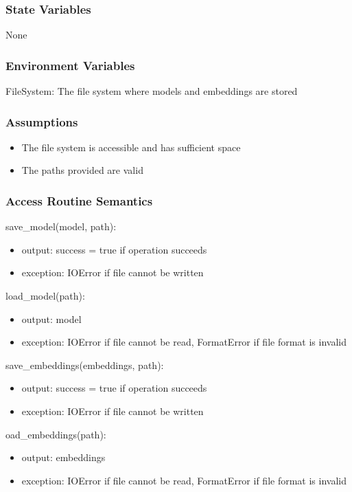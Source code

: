 \documentclass[12pt, titlepage]{article}
\begin{document}
\subsubsection{State Variables}
None

\subsubsection{Environment Variables}

FileSystem: The file system where models and embeddings are stored

\subsubsection{Assumptions}

\begin{itemize}
  \item The file system is accessible and has sufficient space
  \item The paths provided are valid
\end{itemize}

\subsubsection{Access Routine Semantics}

\noindent save\_model(model, path):
\begin{itemize}
\item output:  success = true if operation succeeds
\item exception: IOError if file cannot be written
\end{itemize}

\noindent load\_model(path):
\begin{itemize}
\item output: model
\item exception: IOError if file cannot be read, FormatError if file format is invalid
\end{itemize}

\noindent save\_embeddings(embeddings, path):
\begin{itemize}
\item output: success = true if operation succeeds
\item exception: IOError if file cannot be written
\end{itemize}

\noindent oad\_embeddings(path):
\begin{itemize}
\item output: embeddings
\item exception: IOError if file cannot be read, FormatError if file format is invalid
\end{itemize}
\end{document}
